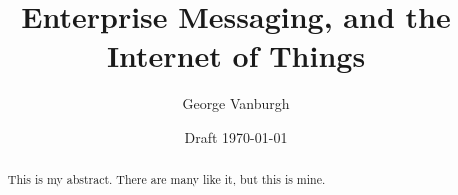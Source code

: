 \documentclass[a4paper,12pt,titlepage]{report}
\title{Enterprise Messaging, and the Internet of Things}
\author{George Vanburgh}
\date{Draft \today}
\begin{document}
  \maketitle

  \begin{abstract}
    This is my abstract. There are many like it, but this is mine.
  \end{abstract}

  \tableofcontents
  \begin{versionhistory}
  \end{versionhistory}
  \newpage
\end{document}
